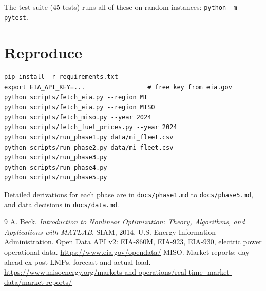 \documentclass[11pt]{article}
\begin{document}
The test suite (45 tests) runs all of these on random instances: \texttt{python -m pytest}.

\section{Reproduce}
\begin{verbatim}
pip install -r requirements.txt
export EIA_API_KEY=...                 # free key from eia.gov
python scripts/fetch_eia.py --region MI
python scripts/fetch_eia.py --region MISO
python scripts/fetch_miso.py --year 2024
python scripts/fetch_fuel_prices.py --year 2024
python scripts/run_phase1.py data/mi_fleet.csv
python scripts/run_phase2.py data/mi_fleet.csv
python scripts/run_phase3.py
python scripts/run_phase4.py
python scripts/run_phase5.py
\end{verbatim}
Detailed derivations for each phase are in \texttt{docs/phase1.md} to \texttt{docs/phase5.md}, and data decisions in \texttt{docs/data.md}.

\begin{thebibliography}{9}
 A. Beck. \emph{Introduction to Nonlinear Optimization: Theory, Algorithms, and Applications with MATLAB}. SIAM, 2014.
 U.S. Energy Information Administration. Open Data API v2: EIA-860M, EIA-923, EIA-930, electric power operational data. \url{https://www.eia.gov/opendata/}
 MISO. Market reports: day-ahead ex-post LMPs, forecast and actual load. \url{https://www.misoenergy.org/markets-and-operations/real-time--market-data/market-reports/}
\end{thebibliography}
\end{document}
